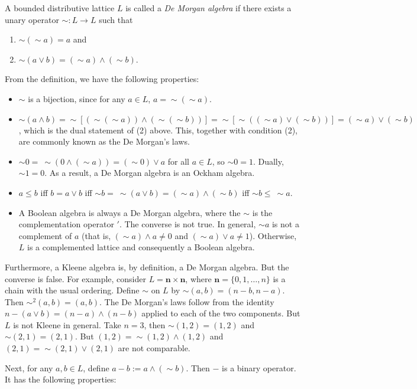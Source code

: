 \documentclass[12pt]{article}
\begin{document}
A bounded distributive lattice $L$ is called a \emph{De Morgan algebra} if there exists a unary operator $\sim:L\to L$ such that
\begin{enumerate}
\item $\sim(\sim a)=a$ and
\item $\sim(a\vee b)=(\sim a )\wedge (\sim b)$.
\end{enumerate}

From the definition, we have the following properties:
\begin{itemize}
\item $\sim$ is a bijection, since for any $a\in L$, $a=\sim (\sim a)$.
\item $\sim(a\wedge b)=\sim [(\sim (\sim a ))\wedge (\sim (\sim b))]=
\sim [\sim ((\sim a)\vee (\sim b)) ]=(\sim a)\vee (\sim b)$, which is the dual statement of (2) above.  This, together with condition (2), are commonly known as the De Morgan's laws.
\item $\sim 0 =\ \sim (0 \wedge (\sim a))=(\sim 0) \vee a$ for all $a\in L$, so $\sim 0 = 1$.  Dually, $\sim 1=0$.  As a result, a De Morgan algebra is an Ockham algebra.
\item $a \le b$ iff $b=a \vee b$ iff $\sim b=\ \sim(a\vee b)=(\sim a)\wedge (\sim b)$ iff $\sim b \le\ \sim a$.
\item A Boolean algebra is always a De Morgan algebra, where the $\sim$ is the complementation operator $'$.  The converse is not true.  In general, $\sim a$ is not a complement of $a$ (that is, $(\sim a)\wedge a \ne 0$ and $(\sim a)\vee a\ne 1$).  Otherwise, $L$ is a complemented lattice and consequently a Boolean algebra.
\end{itemize}

Furthermore, a Kleene algebra is, by definition, a De Morgan algebra.  But the converse is false.  For example, consider $L=\mathbf{n}\times \mathbf{n}$, where $\mathbf{n}=\lbrace 0,1,\ldots,n\rbrace$ is a chain with the usual ordering.  Define $\sim$ on $L$ by $\sim(a,b)=(n-b,n-a)$.  Then $\sim^2(a,b)=(a,b)$.  The De Morgan's laws follow from the identity $n-(a\vee b)=(n-a)\wedge (n-b)$ applied to each of the two components.  But $L$ is not Kleene in general.  Take $n=3$, then $\sim (1,2)=(1,2)$ and $\sim (2,1)=(2,1)$.  But $(1,2)=\sim (1,2)\wedge (1,2)$ and $(2,1)=\sim (2,1)\vee (2,1)$ are not comparable.

Next, for any $a,b\in L$, define $a-b:=a\wedge (\sim b)$.  Then $-$ is a binary operator.  It has the following properties:
\end{document}
